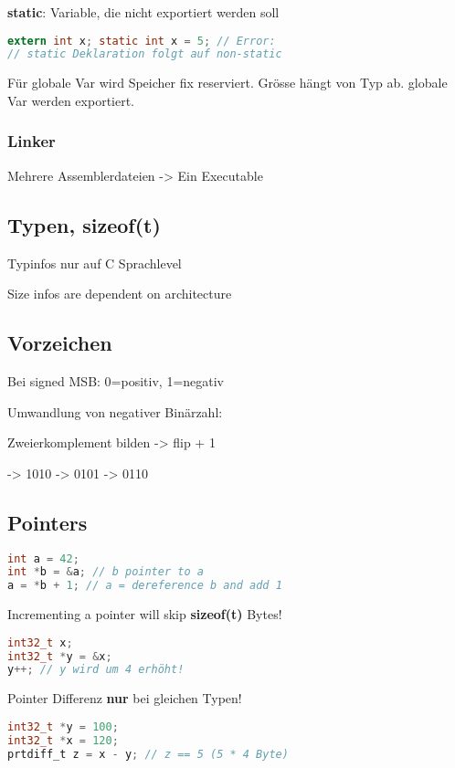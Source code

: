 \begin{multicols*}{4}
\textbf{static}: Variable, die nicht exportiert werden soll

\begin{lstlisting}[language=c]
extern int x; static int x = 5; // Error:
// static Deklaration folgt auf non-static
\end{lstlisting}

Für globale Var wird Speicher fix reserviert. Grösse hängt von Typ ab. globale Var werden exportiert.

\subsubsection{Linker}
Mehrere Assemblerdateien -> Ein Executable

\subsection{Typen, sizeof(t)}
Typinfos nur auf C Sprachlevel

Size infos are dependent on architecture

\subsection{Vorzeichen}
Bei signed MSB: 0=positiv, 1=negativ

Umwandlung von negativer Binärzahl:

Zweierkomplement bilden -> flip + 1

-> 1010 -> 0101 -> 0110

\subsection{Pointers}

\begin{lstlisting}[language=c]
int a = 42;
int *b = &a; // b pointer to a
a = *b + 1; // a = dereference b and add 1
\end{lstlisting}
Incrementing a pointer will skip \textbf{sizeof(t)} Bytes!
\begin{lstlisting}[language=c]
int32_t x;
int32_t *y = &x;
y++; // y wird um 4 erhöht!
\end{lstlisting}
\vspace{2pt}
Pointer Differenz \textbf{nur} bei gleichen Typen!
\begin{lstlisting}[language=c]
int32_t *y = 100;
int32_t *x = 120;
prtdiff_t z = x - y; // z == 5 (5 * 4 Byte)
\end{lstlisting}


\end{multicols*}
